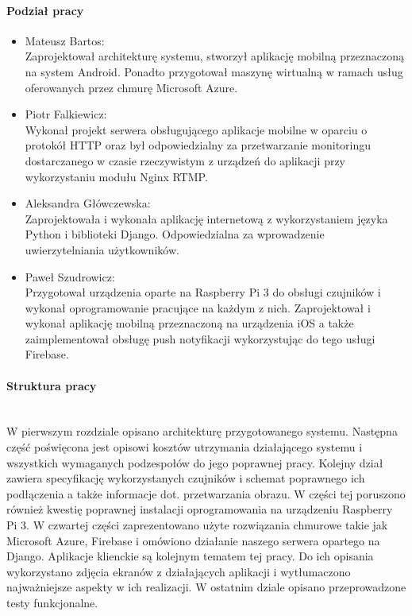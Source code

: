 \paragraph{Podział pracy}
\begin{itemize}
\item Mateusz Bartos: \\
Zaprojektował architekturę systemu, stworzył aplikację mobilną przeznaczoną na system Android. Ponadto przygotował maszynę wirtualną w ramach usług oferowanych przez chmurę Microsoft Azure.
\item Piotr Falkiewicz: \\
Wykonał projekt serwera obsługującego aplikacje mobilne w oparciu o protokół HTTP oraz był odpowiedzialny za przetwarzanie monitoringu dostarczanego w czasie rzeczywistym z urządzeń do aplikacji przy wykorzystaniu modułu Nginx RTMP.
\item Aleksandra Główczewska: \\
Zaprojektowała i wykonała aplikację internetową z wykorzystaniem języka Python i biblioteki Django. Odpowiedzialna za wprowadzenie uwierzytelniania użytkowników.
\item Paweł Szudrowicz: \\
Przygotował urządzenia oparte na Raspberry Pi 3 do obsługi czujników i wykonał oprogramowanie pracujące na każdym z nich. Zaprojektował i wykonał aplikację mobilną przeznaczoną na urządzenia iOS a także zaimplementował obsługę push notyfikacji wykorzystując do tego usługi Firebase.
\end{itemize}

\paragraph{Struktura pracy} \\
W pierwszym rozdziale opisano architekturę przygotowanego systemu. Następna część poświęcona jest opisowi kosztów utrzymania działającego systemu i wszystkich wymaganych podzespołów do jego poprawnej pracy. Kolejny dział zawiera specyfikację wykorzystanych czujników i schemat poprawnego ich podłączenia a także informacje dot. przetwarzania obrazu. W części tej poruszono również kwestię poprawnej instalacji oprogramowania na urządzeniu Raspberry Pi 3.  W czwartej części zaprezentowano użyte rozwiązania chmurowe takie jak Microsoft Azure, Firebase i omówiono działanie naszego serwera opartego na Django. Aplikacje klienckie są kolejnym tematem tej pracy. Do ich opisania wykorzystano zdjęcia ekranów z działających aplikacji i wytłumaczono najważniejsze aspekty w ich realizacji. W ostatnim dziale opisano przeprowadzone testy funkcjonalne.